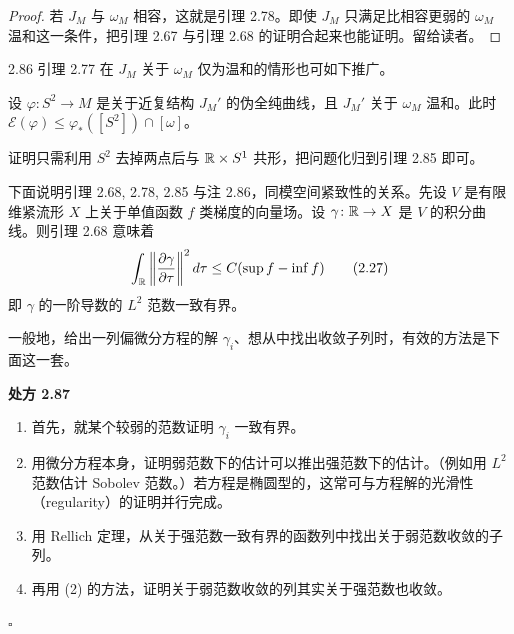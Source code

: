 \begin{proof}
  若 $J_M$ 与 $\omega_M$ 相容，这就是引理 2.78。即使 $J_M$ 只满足比相容更弱的 $\omega_M$ 温和这一条件，把引理 2.67 与引理 2.68 的证明合起来也能证明。留给读者。
\end{proof}

\begin{remark}{2.86}
  引理 2.77 在 $J_M$ 关于 $\omega_M$ 仅为温和的情形也可如下推广。

  设 $\varphi\colon S^2\to M$ 是关于近复结构 $J_M'$ 的伪全纯曲线，且 $J_M'$ 关于 $\omega_M$ 温和。此时 $\mathcal{E}(\varphi)\le\varphi_*([S^2])\cap[\omega]$。

  证明只需利用 $S^2$ 去掉两点后与 $\mathbb{R}\times S^1$ 共形，把问题化归到引理 2.85 即可。
\end{remark}


下面说明引理 2.68, 2.78, 2.85 与注 2.86，同模空间紧致性的关系。先设 $V$ 是有限维紧流形 $X$ 上关于单值函数 $f$ 类梯度的向量场。设 $\gamma\colon\mathbb{R}\to X$ 是 $V$ 的积分曲线。则引理 2.68 意味着
\begin{equation}
  \int_{\mathbb{R}}\left\|\frac{\partial\gamma}{\partial\tau}\right\|^2d\tau\le C(\sup f-\inf f) \tag{2.27}
\end{equation}
即 $\gamma$ 的一阶导数的 $L^2$ 范数一致有界。

一般地，给出一列偏微分方程的解 $\gamma_i$、想从中找出收敛子列时，有效的方法是下面这一套。

\textbf{处方 2.87}
\begin{enumerate}[label=（\arabic*）,leftmargin=2.8em]
  \item 首先，就某个较弱的范数证明 $\gamma_i$ 一致有界。
  \item 用微分方程本身，证明弱范数下的估计可以推出强范数下的估计。（例如用 $L^2$ 范数估计 Sobolev 范数。）若方程是椭圆型的，这常可与方程解的光滑性（regularity）的证明并行完成。
  \item 用 Rellich 定理，从关于强范数一致有界的函数列中找出关于弱范数收敛的子列。
  \item 再用 (2) 的方法，证明关于弱范数收敛的列其实关于强范数也收敛。
\end{enumerate}
\hfill$\square$


